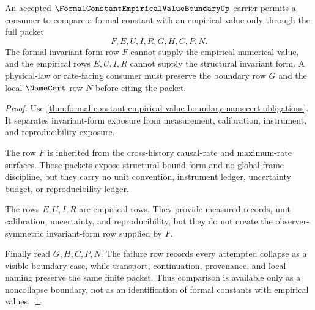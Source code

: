\begin{theorem}
\label{thm:formal-constant-empirical-value-boundary-noncollapse}
An accepted $\FormalConstantEmpiricalValueBoundaryUp$ carrier permits a consumer to compare a formal constant with an empirical value only through the full packet
$$
F,E,U,I,R,G,H,C,P,N .
$$
The formal invariant-form row $F$ cannot supply the empirical numerical value, and the empirical rows $E,U,I,R$ cannot supply the structural invariant form. A physical-law or rate-facing consumer must preserve the boundary row $G$ and the local $\NameCert$ row $N$ before citing the packet.
\end{theorem}
\begin{proof}
Use \autoref{thm:formal-constant-empirical-value-boundary-namecert-obligations}. It separates invariant-form exposure from measurement, calibration, instrument, and reproducibility exposure.

The row $F$ is inherited from the cross-history causal-rate and maximum-rate surfaces. Those packets expose structural bound form and no-global-frame discipline, but they carry no unit convention, instrument ledger, uncertainty budget, or reproducibility ledger.

The rows $E,U,I,R$ are empirical rows. They provide measured records, unit calibration, uncertainty, and reproducibility, but they do not create the observer-symmetric invariant-form row supplied by $F$.

Finally read $G,H,C,P,N$. The failure row records every attempted collapse as a visible boundary case, while transport, continuation, provenance, and local naming preserve the same finite packet. Thus comparison is available only as a noncollapse boundary, not as an identification of formal constants with empirical values.
\end{proof}



